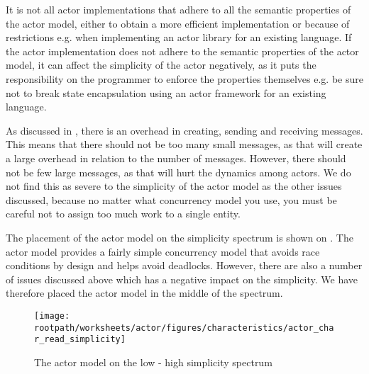 It is not all actor implementations that adhere to all the semantic properties of the actor model, either to obtain a more efficient implementation or because of restrictions e.g. when implementing an actor library for an existing language. If the actor implementation does not adhere to the semantic properties of the actor model, it can affect the simplicity of the actor negatively, as it puts the responsibility on the programmer to enforce the properties themselves e.g. be sure not to break state encapsulation using an actor framework for an existing language.

As discussed in , there is an overhead in creating, sending and receiving messages. This means that there should not be too many small messages, as that will create a large overhead in relation to the number of messages. However, there should not be few large messages, as that will hurt the dynamics among actors. We do not find this as severe to the simplicity of the actor model as the other issues discussed, because no matter what concurrency model you use, you must be careful not to assign too much work to a single entity.

The placement of the actor model on the simplicity spectrum is shown on . The actor model provides a fairly simple concurrency model that avoids race conditions by design and helps avoid deadlocks. However, there are also a number of issues discussed above which has a negative impact on the simplicity. We have therefore placed the actor model in the middle of the spectrum.

\begin{figure}[htbp]
\centering
 \texttt{[image: \\rootpath/worksheets/actor/figures/characteristics/actor\_char\_read\_simplicity]} 
 \caption{The actor model on the low - high simplicity spectrum}
\label{fig:actor_read_simplicity}
\end{figure}
